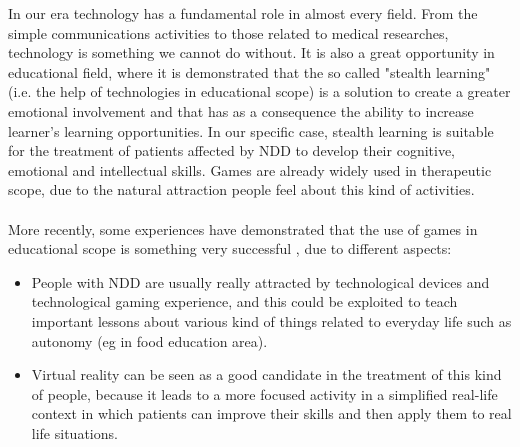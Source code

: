 In our era technology has a fundamental role in almost every field. From the simple communications activities to those related to medical researches, technology is something we cannot do without. It is also a great opportunity in educational field, where it is demonstrated that the so called "stealth learning" (i.e. the help of technologies in educational scope) \cite{Sharp} is a solution to create a greater emotional involvement and that has as a consequence the ability to increase learner's learning opportunities. In our specific case, stealth learning is suitable for the treatment of patients affected by NDD to develop their cognitive, emotional and intellectual skills. Games are already widely used in therapeutic scope, due to the natural attraction people feel about this kind of activities. \\
\\
More recently, some experiences have demonstrated that the use of games in educational scope is something very successful \cite{Mazzone}, due to different aspects:
\begin{itemize}
\item People with NDD are usually really attracted by technological devices and technological gaming experience, and this could be exploited to teach important lessons about various kind of things related to everyday life such as autonomy (eg in food education area).
\item Virtual reality can be seen as a good candidate in the treatment of this kind of people, because it leads to a more focused activity in a simplified real-life context in which patients can improve their skills and then apply them to real life situations.
\end{itemize}


